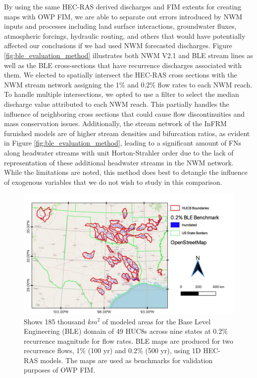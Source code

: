 \documentclass[draft]{dependencies/agujournal2019}
\begin{document}
By using the same HEC-RAS derived discharges and FIM extents for creating maps with OWP FIM, we are able to separate out errors introduced by NWM inputs and processes including land surface interactions, groundwater fluxes, atmospheric forcings, hydraulic routing, and others that would have potentially affected our conclusions if we had used NWM forecasted discharges.
Figure \ref{fig:ble_evaluation_method} illustrates both NWM V2.1 and BLE stream lines as well as the BLE cross-sections that have recurrence discharges associated with them.
We elected to spatially intersect the HEC-RAS cross sections with the NWM stream network assigning the 1\% and 0.2\% flow rates to each NWM reach. 
To handle multiple intersections, we opted to use a filter to select the median discharge value attributed to each NWM reach.
This partially handles the influence of neighboring cross sections that could cause flow discontinuities and mass conservation issues.
Additionally, the stream network of the InFRM furnished models are of higher stream densities and bifurcation ratios, as evident in Figure \ref{fig:ble_evaluation_method}, leading to a significant amount of FNs along headwater streams with unit Horton-Strahler order due to the lack of representation of these additional headwater streams in the NWM network.
While the limitations are noted, this method does best to detangle the influence of exogenous variables that we do not wish to study in this comparison.
%
\begin{figure}[H]
\centering
\includegraphics[scale=1.0]{figures/all_ble_maps.jpg}
\caption{
Shows 185 thousand $km^2$ of modeled areas for the Base Level Engineering (BLE) domain of 49 HUC8s across nine states at 0.2\% recurrence magnitude for flow rates.
BLE maps are produced for two recurrence flows, 1\% (100 yr) and 0.2\% (500 yr), using 1D HEC-RAS models.
The maps are used as benchmarks for validation purposes of OWP FIM.
}
\label{fig:all_ble_maps}
\end{figure}
\end{document}
